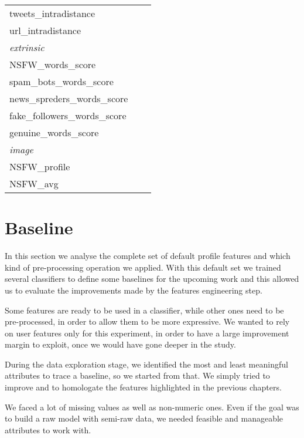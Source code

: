 \begin{center}
\begin{tabular}{lll}
		\hline
		tweets\_intradistance\\
		url\_intradistance\\
		\hline
		\textit{extrinsic}\\
		\hline
		NSFW\_words\_score\\
		spam\_bots\_words\_score\\
		news\_spreders\_words\_score\\
		fake\_followers\_words\_score\\
		genuine\_words\_score\\
		\hline
		\textit{image}\\
		\hline
		NSFW\_profile\\
		NSFW\_avg\\\hline
	\end{tabular}
\end{center}
\normalsize


\section{Baseline}
In this section we analyse the complete set of default profile features and which kind of pre-processing operation we applied. With this default set we trained several classifiers to define some baselines for the upcoming work and this allowed us to evaluate the improvements made by the features engineering step.

Some features are ready to be used in a classifier, while other ones need to be pre-processed, in order to allow them to be more expressive.
We wanted to rely on user features only for this experiment, in order to have a large improvement margin to exploit, once we would have gone deeper in the study.

During the data exploration stage, we identified the most and least meaningful attributes to trace a baseline, so we started from that. We simply tried to improve and to homologate the features highlighted in the previous chapters.

We faced a lot of missing values as well as non-numeric ones.
Even if the goal was to build a raw model with semi-raw data, we needed feasible and manageable attributes to work with.

